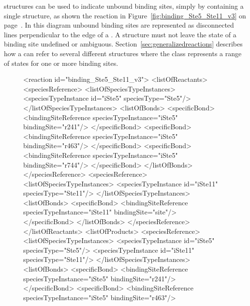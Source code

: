 \documentclass{cekarticle}
\begin{document}
 structures can be used to indicate unbound
binding sites, simply by containing a single
 structure, as shown the reaction in
Figure~\ref{fig:binding_Ste5_Ste11_v3} on
page~\pageref{fig:binding_Ste5_Ste11_v3}.  In this diagram unbound
binding sites are represented as disconnected lines perpendicular
to the edge of a .  A
 structure must not leave the state of a
binding site undefined or ambiguous.
Section~\ref{sec:generalizedreactions} describes how a
 can refer to several different
 structures where the class represents a range
of states for one or more binding sites.

\begin{figure}[h]
\begin{example}
<reaction id="binding_Ste5_Ste11_v3">
    <listOfReactants>
        <speciesReference>
            <listOfSpeciesTypeInstances>
                <speciesTypeInstance id="iSte5" speciesType="Ste5"/>
            </listOfSpeciesTypeInstances>
            <listOfBonds>
                <specificBond>
                    <bindingSiteReference speciesTypeInstance="iSte5" bindingSite="r241"/>
                </specificBond>
                <specificBond>
                    <bindingSiteReference speciesTypeInstance="iSte5" bindingSite="r463"/>
                </specificBond>
                <specificBond>
                    <bindingSiteReference speciesTypeInstance="iSte5" bindingSite="r744"/>
                </specificBond>
            </listOfBonds>
        </speciesReference>
        <speciesReference>
            <listOfSpeciesTypeInstances>
                <speciesTypeInstance id="iSte11" speciesType="Ste11"/>
            </listOfSpeciesTypeInstances>
            <listOfBonds>
                <specificBond>
                    <bindingSiteReference speciesTypeInstance="iSte11" bindingSite="site"/>
                </specificBond>
            </listOfBonds>
         </speciesReference>
    </listOfReactants>
    <listOfProducts>
        <speciesReference>
            <listOfSpeciesTypeInstances>
                <speciesTypeInstance id="iSte5" speciesType="Ste5"/>
                <speciesTypeInstance id="iSte11" speciesType="Ste11"/>
            </listOfSpeciesTypeInstances>
            <listOfBonds>
                <specificBond>
                    <bindingSiteReference speciesTypeInstance="iSte5" bindingSite="r241"/>
                </specificBond>
                <specificBond>
                    <bindingSiteReference speciesTypeInstance="iSte5" bindingSite="r463"/>

\end{example}
\end{figure}
\end{document}
